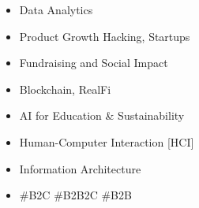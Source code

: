 

\begin{itemize}
 \setlength\itemsep{-0.3em}
\item Data Analytics
\item Product Growth Hacking, Startups
\item Fundraising and Social Impact
\item Blockchain, RealFi
\item AI for Education \& Sustainability
\item Human-Computer Interaction [HCI]
\item Information Architecture
\item \#B2C \#B2B2C \#B2B


\end{itemize}
